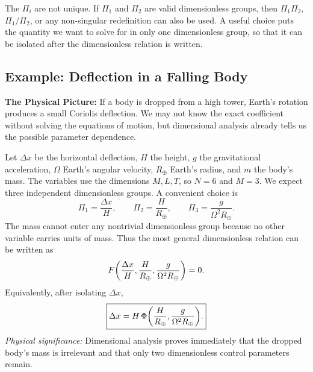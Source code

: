 The $\Pi_i$ are not unique. If $\Pi_1$ and $\Pi_2$ are valid dimensionless
groups, then $\Pi_1\Pi_2$, $\Pi_1/\Pi_2$, or any non-singular redefinition can
also be used. A useful choice puts the quantity we want to solve for in only
one dimensionless group, so that it can be isolated after the dimensionless
relation is written.

\subsection{Example: Deflection in a Falling Body}
\label{sec:lec05:coriolis-example}

\textbf{The Physical Picture:}
If a body is dropped from a high tower, Earth's rotation produces a small
Coriolis deflection. We may not know the exact coefficient without solving the
equations of motion, but dimensional analysis already tells us the possible
parameter dependence.

Let $\Delta x$ be the horizontal deflection, $H$ the height, $g$ the
gravitational acceleration, $\Omega$ Earth's angular velocity, $R_\oplus$
Earth's radius, and $m$ the body's mass. The variables use the dimensions
$M,L,T$, so $N=6$ and $M=3$. We expect three independent dimensionless groups.
A convenient choice is
\begin{equation}
    \Pi_1=\frac{\Delta x}{H},\qquad
    \Pi_2=\frac{H}{R_\oplus},\qquad
    \Pi_3=\frac{g}{\Omega^2 R_\oplus}.
    \label{eq:lec05:coriolis-pi-groups}
\end{equation}
The mass cannot enter any nontrivial dimensionless group because no other
variable carries units of mass. Thus the most general dimensionless relation
can be written as
\begin{equation}
    F\qty(\frac{\Delta x}{H},\frac{H}{R_\oplus},
    \frac{g}{\Omega^2R_\oplus})=0 .
    \label{eq:lec05:coriolis-general-relation}
\end{equation}
Equivalently, after isolating $\Delta x$,
\begin{equation}
    \boxed{
    \Delta x =
    H\,\Phi\qty(\frac{H}{R_\oplus},
    \frac{g}{\Omega^2R_\oplus}) .
    }
    \label{eq:lec05:coriolis-dimensional-result}
\end{equation}
\textit{Physical significance:} Dimensional analysis proves immediately that
the dropped body's mass is irrelevant and that only two dimensionless control
parameters remain.

